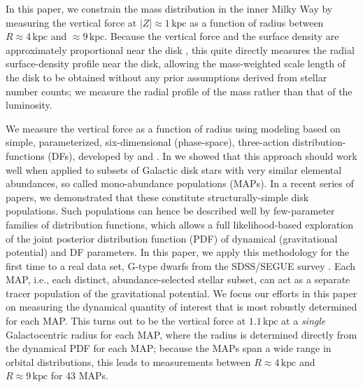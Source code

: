 \documentclass{emulateapj}
\newcommand{\ie}{i.e.}
\newcommand{\map}{MAP}
\newcommand{\kpc}{\ensuremath{\,\mathrm{kpc}}}
\begin{document}
In this paper, we constrain the mass distribution in the inner Milky
Way by measuring the vertical force at $|Z|\approx1\kpc$ as a function
of radius between $R\approx 4\kpc$ and $\approx9\kpc$. Because the
vertical force and the surface density are approximately proportional
near the disk \citep{Kuijken89a,BovyTremaine}, this quite directly
measures the radial surface-density profile near the disk, allowing
the mass-weighted scale length of the disk to be obtained without any
prior assumptions derived from stellar number counts; we measure the
radial profile of the mass rather than that of the luminosity.

We measure the vertical force as a function of radius using modeling
based on simple, parameterized, six-dimensional (phase-space),
three-action distribution-functions (DFs), developed by
\citet{Binney10a,Binney12b} and \citet{McMillan13a}. In
\citet{Ting13a} we showed that this approach should work well when
applied to subsets of Galactic disk stars with very similar elemental
abundances, so called mono-abundance populations (\map s). In a recent
series of papers, we \citep{BovyMAPkinematics,BovyMAPstructure}
demonstrated that these constitute structurally-simple disk
populations. Such populations can hence be described well by
few-parameter families of distribution functions, which allows a full
likelihood-based exploration of the joint posterior distribution
function (PDF) of dynamical (gravitational potential) and DF
parameters. In this paper, we apply this methodology for the first
time to a real data set, G-type dwarfs from the SDSS/SEGUE survey
\citep{Yanny09a}. Each \map, \ie, each distinct, abundance-selected
stellar subset, can act as a separate tracer population of the
gravitational potential. We focus our efforts in this paper on
measuring the dynamical quantity of interest that is most robustly
determined for each \map. This turns out to be the vertical force at
$1.1\kpc$ at a \emph{single} Galactocentric radius for each \map,
where the radius is determined directly from the dynamical PDF for
each \map; because the \map s span a wide range in orbital
distributions, this leads to measurements between $R\approx4\kpc$ and
$R\approx9\kpc$ for 43 \map s.
\end{document}
